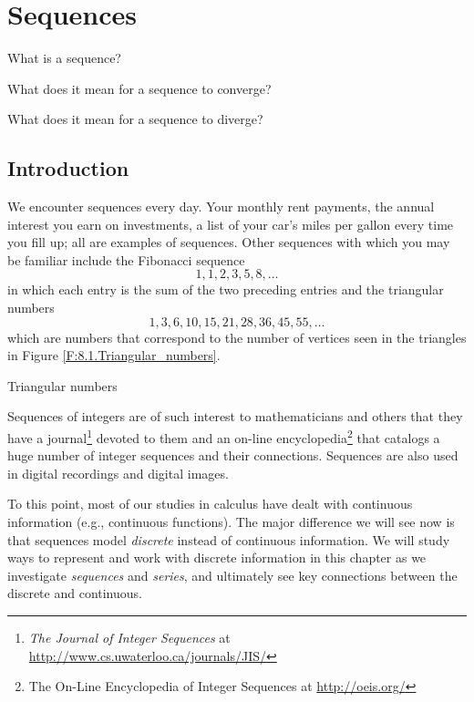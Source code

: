 \section{Sequences} \label{S:7.1.Sequences}

\begin{goals}
\item What is a sequence?
\item What does it mean for a sequence to converge?
\item What does it mean for a sequence to diverge?
\end{goals}

\subsection*{Introduction}

We encounter sequences every day. Your monthly rent payments, the annual interest you earn on investments, a list of your car's miles per gallon every time you fill up; all are examples of sequences. Other sequences with which you may be familiar include the Fibonacci sequence
\[1, 1, 2, 3, 5, 8, \ldots\]
in which each entry is the sum of the two preceding entries and the triangular numbers
\[1, 3, 6, 10, 15, 21, 28, 36, 45, 55, \ldots\]
which are numbers that correspond to the number of vertices seen in the triangles in Figure \ref{F:8.1.Triangular_numbers}.
\begin{marginfigure} %
\caption{Triangular numbers}
\label{F:8.1.Triangular_numbers}
\end{marginfigure}
Sequences of integers are of such interest to mathematicians and others that they have a journal\footnote{\emph{The Journal of Integer Sequences} at \url{http://www.cs.uwaterloo.ca/journals/JIS/}} devoted to them and an on-line encyclopedia\footnote{The On-Line Encyclopedia of Integer Sequences at \url{http://oeis.org/}} that catalogs a huge number of integer sequences and their connections. Sequences are also used in digital recordings and digital images. 

To this point, most of our studies in calculus have dealt with continuous information (e.g., continuous functions). The major difference we will see now is that sequences model \emph{discrete} instead of continuous information. We will study ways to represent and work with discrete information in this chapter as we investigate \emph{sequences} and \emph{series}, and ultimately see key connections between the discrete and continuous.

